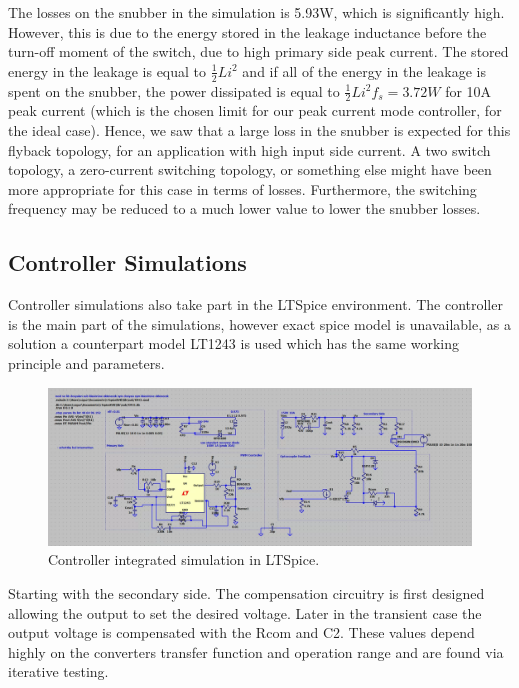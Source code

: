 \documentclass[12pt]{article}
\begin{document}
    The losses on the snubber in the simulation is 5.93W, which is significantly high. However, this is due to the energy stored in the leakage inductance before the turn-off moment of the switch, due to high primary side peak current. The stored energy in the leakage is equal to $\frac{1}{2}Li^2$ and if all of the energy in the leakage is spent on the snubber, the power dissipated is equal to $\frac{1}{2}Li^2f_s = 3.72W$ for 10A peak current (which is the chosen limit for our peak current mode controller, for the ideal case). Hence, we saw that a large loss in the snubber is expected for this flyback topology, for an application with high input side current. A two switch topology, a zero-current switching topology, or something else might have been more appropriate for this case in terms of losses. Furthermore, the switching frequency may be reduced to a much lower value to lower the snubber losses.

    \subsection{Controller Simulations}

    Controller simulations also take part in the LTSpice environment. The controller is the main part of the simulations, however exact spice model is unavailable, as a solution a counterpart model LT1243 is used which has the same working principle and parameters. 
    
    \begin{figure}[H]
        \centering
        \includegraphics[scale=0.4]{img/controller.png}
        \caption{Controller integrated simulation in LTSpice.}
        \label{fig:controller}
    \end{figure}

     Starting with the secondary side. The compensation circuitry is first designed allowing the output to set the desired voltage. Later in the transient case the output voltage is compensated with the Rcom and C2. These values depend highly on the converters transfer function and operation range and are found via iterative testing.\\
\end{document}

